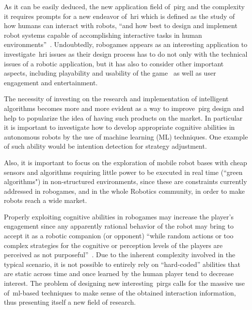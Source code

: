 

As it can be easily deduced, the new application field of~\gls{pirg} and the complexity it requires prompts for a new endeavor of~\gls{hri} which is defined as the study of how humans can interact with robots, ``and how best to design and implement robot systems capable of accomplishing interactive tasks in human environments''~\citep{feil-seifer_human_2009}. Undoubtedly, robogames appears as an interesting application to investigate~\gls{hri} issues as their design process has to do not only with the technical issues of a robotic application, but it has also to consider other important aspects, including playability and usability of the game~\citep{martinoia_physically_2013} as well as user engagement and entertainment.

The necessity of investing on the research and implementation of intelligent algorithms becomes more and more evident as a way to improve~\gls{pirg} design and help to popularize the idea of having such products on the market. In particular it is important to investigate how to develop appropriate cognitive abilities in autonomous robots by the use of machine learning (ML) techniques. One example of such ability would be  intention detection for strategy adjustment. 

Also, it is important to focus on the exploration of mobile robot bases with cheap sensors and algorithms requiring little power to be executed in real time (``green algorithms") in non-structured environments, since these are constraints currently addressed in robogames, and in the whole Robotics community, in order to make robots reach a wide market. 

Properly exploiting cognitive abilities in robogames may increase the player's engagement since any apparently rational behavior of the robot may bring to accept it as a robotic companion (or opponent) ``while random actions or too complex strategies for the cognitive or perception levels of the players are perceived as not purposeful''~\citep{martinoia_physically_2013}. Due to the inherent complexity involved in the typical scenario, it is not possible to entirely rely on ``hard-coded'' abilities that are static across time and once learned by the human player tend to decrease interest. The problem of designing new interesting~\gls{pirg}s calls for the massive use of~\gls{ml}-based techniques to make sense of the obtained interaction information, thus presenting itself a new field of research.


